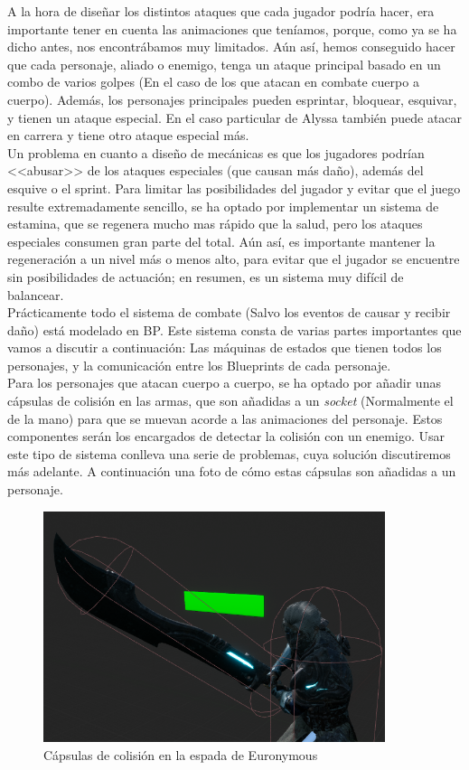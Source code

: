 A la hora de diseñar los distintos ataques que cada jugador podría hacer, era importante tener en cuenta las animaciones que teníamos, porque, como ya se ha dicho antes, nos encontrábamos muy limitados. Aún así, hemos conseguido hacer que cada personaje, aliado o enemigo, tenga un ataque principal basado en un combo de varios golpes (En el caso de los que atacan en combate cuerpo a cuerpo). Además, los personajes principales pueden esprintar, bloquear, esquivar, y tienen un ataque especial.
En el caso particular de Alyssa también puede atacar en carrera y tiene otro ataque especial más. 
\\

Un problema en cuanto a diseño de mecánicas es que los jugadores podrían <<abusar>> de los ataques especiales (que causan más daño), además del esquive o el sprint. Para limitar las posibilidades del jugador y evitar que el juego resulte extremadamente sencillo, se ha optado por implementar un sistema de estamina, que se regenera mucho mas rápido que la salud, pero los ataques especiales consumen gran parte del total. Aún así, es importante mantener la regeneración a un nivel más o menos alto, para evitar que el jugador se encuentre sin posibilidades de actuación; en resumen, es un sistema muy difícil de balancear. 
\\

Prácticamente todo el sistema de combate (Salvo los eventos de causar y recibir daño) está modelado en \ac{BP}. Este sistema consta de varias partes importantes que vamos a discutir a continuación: Las máquinas de estados que tienen todos los personajes, y la comunicación entre los Blueprints de cada personaje.
\\

Para los personajes que atacan cuerpo a cuerpo, se ha optado por añadir unas cápsulas de colisión en las armas, que son añadidas a un \textit{socket} (Normalmente el de la mano) para que se muevan acorde a las animaciones del personaje. Estos componentes serán los encargados de detectar la colisión con un enemigo. Usar este tipo de sistema conlleva una serie de problemas, cuya solución discutiremos más adelante. A continuación una foto de cómo estas cápsulas son añadidas a un personaje.


\begin{figure}[H]
  \centering
  \includegraphics[width=10cm]{./images/Eur_Weapon.png}
  \caption{Cápsulas de colisión en la espada de Euronymous}
  \label{HenkkaSM}
\end{figure}


